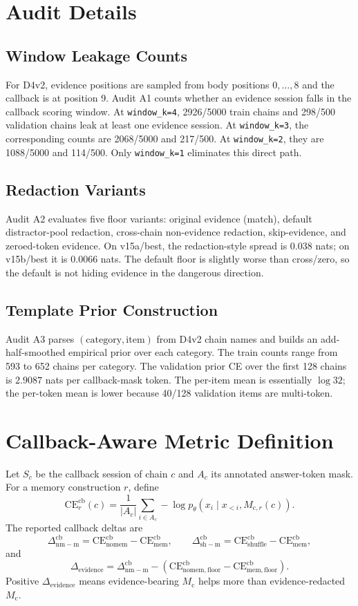\documentclass{article}
\newcommand{\Mc}{M_{\mathrm{c}}}
\newcommand{\dnm}{\Delta_{\mathrm{nm-m}}}
\newcommand{\dsh}{\Delta_{\mathrm{sh-m}}}
\newcommand{\elift}{\Delta_{\mathrm{evidence}}}
\begin{document}
\appendix

\section{Audit Details}

\subsection{Window Leakage Counts}
For D4v2, evidence positions are sampled from body positions $0,\ldots,8$
and the callback is at position 9.  Audit A1 counts whether an evidence
session falls in the callback scoring window.  At \texttt{window\_k=4},
2926/5000 train chains and 298/500 validation chains leak at least one
evidence session.  At \texttt{window\_k=3}, the corresponding counts are
2068/5000 and 217/500.  At \texttt{window\_k=2}, they are 1088/5000 and
114/500.  Only \texttt{window\_k=1} eliminates this direct path.

\subsection{Redaction Variants}
Audit A2 evaluates five floor variants: original evidence (match),
default distractor-pool redaction, cross-chain non-evidence redaction,
skip-evidence, and zeroed-token evidence.  On v15a/best, the
redaction-style spread is 0.038 nats; on v15b/best it is 0.0066 nats.
The default floor is slightly worse than cross/zero, so the default is
not hiding evidence in the dangerous direction.

\subsection{Template Prior Construction}
Audit A3 parses $(\mathrm{category},\mathrm{item})$ from D4v2 chain
names and builds an add-half-smoothed empirical prior over each
category.  The train counts range from 593 to 652 chains per category.
The validation prior CE over the first 128 chains is $2.9087$ nats per
callback-mask token.  The per-item mean is essentially $\log 32$; the
per-token mean is lower because 40/128 validation items are multi-token.

\section{Callback-Aware Metric Definition}

Let $S_c$ be the callback session of chain $c$ and $A_c$ its annotated
answer-token mask.  For a memory construction $r$, define
\[
\mathrm{CE}_r^{\mathrm{cb}}(c)=
\frac{1}{|A_c|}\sum_{i\in A_c}
  -\log p_\theta(x_i \mid x_{<i}, M_{\mathrm{c},r}(c)).
\]
The reported callback deltas are
\[
\dnm^{\mathrm{cb}}=
\mathrm{CE}_{\mathrm{nomem}}^{\mathrm{cb}}-
\mathrm{CE}_{\mathrm{mem}}^{\mathrm{cb}},\qquad
\dsh^{\mathrm{cb}}=
\mathrm{CE}_{\mathrm{shuffle}}^{\mathrm{cb}}-
\mathrm{CE}_{\mathrm{mem}}^{\mathrm{cb}},
\]
and
\[
\elift =
\dnm^{\mathrm{cb}} -
\left(
\mathrm{CE}_{\mathrm{nomem,floor}}^{\mathrm{cb}}-
\mathrm{CE}_{\mathrm{mem,floor}}^{\mathrm{cb}}
\right).
\]
Positive $\elift$ means evidence-bearing $\Mc$ helps more than
evidence-redacted $\Mc$.
\end{document}
